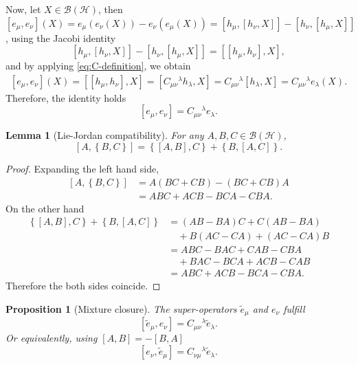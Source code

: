 \documentclass[notitlepage,aip,reprint,onecolumn]{revtex4-1}
\newtheorem{proposition}[theorem]{Proposition}
\newtheorem{lemma}[theorem]{Lemma}
\theoremstyle{definition}
\newcommand{\HH}{\mathcal H}
\newcommand{\BH}{\mathcal B(\HH)}
\renewcommand{\comm}[2]{\left[#1,#2\right]}
\newcommand{\acom}[2]{\left\{#1,#2\right\}}
\begin{document}
Now, let $X\in\BH$, then \( \comm{e_\mu}{e_\nu}(X) =e_\mu(e_\nu(X))-e_\nu(e_\mu(X)) =\comm{h_\mu}{\comm{h_\nu}{X}} -\comm{h_\nu}{\comm{h_\mu}{X}}\), using the Jacobi identity 
\[
     \comm{h_\mu}{\comm{h_\nu}{X}}
     -\comm{h_\nu}{\comm{h_\mu}{X}}
     =\comm{\comm{h_\mu}{h_\nu}}{X},
\]
and by applying \eqref{eq:C-definition}, we obtain
\begin{align*}
     \comm{e_\mu}{e_\nu}(X)=\comm{\comm{h_\mu}{h_\nu}}{X}=\comm{C_{\mu\nu}{}^\lambda h_\lambda}{X}=C_{\mu\nu}{}^\lambda\comm{h_\lambda}{X}=C_{\mu\nu}{}^\lambda e_\lambda(X).
\end{align*}
Therefore, the identity holds \cite{georgi2000lie}
\begin{equation} \label{eq:e-e-closure}
 \comm{e_\mu}{e_\nu}=C_{\mu\nu}{}^\lambda e_\lambda.
\end{equation}
\begin{lemma}[Lie-Jordan compatibility]
For any $A,B,C\in\BH$,
\begin{equation}
     \comm{A}{\acom{B}{C}} \label{eq:comm-derivation-anticomm}
     =\acom{\comm{A}{B}}{C}+\acom{B}{\comm{A}{C}}.
\end{equation}
\end{lemma}
\begin{proof}
Expanding the left hand side,
\begin{align*}
     \comm{A}{\acom{B}{C}}
     &=A(BC+CB)-(BC+CB)A
     \\
     &=ABC+ACB-BCA-CBA.
\end{align*}
On the other hand 
\begin{align*}
     \acom{\comm{A}{B}}{C}+\acom{B}{\comm{A}{C}}
     &=(AB-BA)C+C(AB-BA)
     \\
     &\quad +B(AC-CA)+(AC-CA)B
     \\
     &=ABC-BAC+CAB-CBA
     \\
     &\quad +BAC-BCA+ACB-CAB
     \\
     &=ABC+ACB-BCA-CBA.
\end{align*}
Therefore the both sides coincide.
\end{proof}
\begin{proposition}[Mixture closure]
The super-operators $\widetilde e_\mu$ and $e_\nu$ fulfill
\begin{equation} \label{eq:etilde-e-closure}
 \comm{\widetilde e_\mu}{e_\nu}=C_{\mu\nu}{}^\lambda\widetilde e_\lambda.
\end{equation}
Or equivalently, using $\comm{A}{B}=-\comm{B}{A}$ 
\[
     \comm{e_\nu}{\widetilde e_\mu}=C_{\nu\mu}{}^\lambda\widetilde e_\lambda.
\]
\end{proposition}
\end{document}
